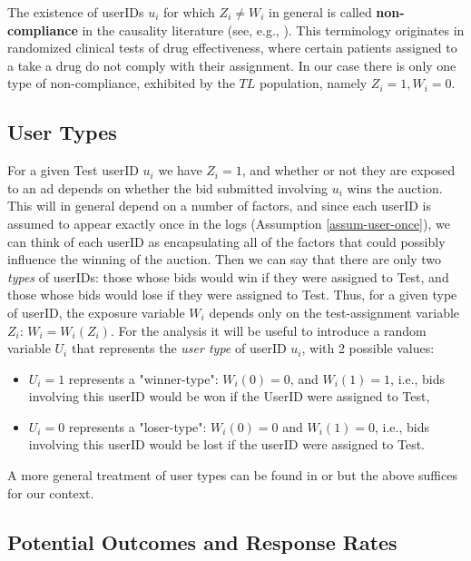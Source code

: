 \documentclass[11pt,a4paper]{article}
\theoremstyle{definition}
\theoremstyle{remark}
\theoremstyle{definition}
\theoremstyle{definition}
\theoremstyle{definition}
\theoremstyle{definition}
\theoremstyle{definition}
\theoremstyle{definition}
\begin{document}
The existence of userIDs $u_i$ for which $Z_i \neq W_i$ in general is called {\bf non-compliance} in the causality literature 
(see, e.g., \cite{Imbens1997a}). This terminology originates in randomized clinical tests of drug effectiveness, where certain patients assigned to a take a drug do not comply with their assignment. In our case there is only one type of non-compliance, exhibited by the $TL$ population, namely $Z_i = 1, W_i=0$. 

\subsection{User Types} \label{sec-user-types}
For a given Test userID $u_i$ we have $Z_i=1$, and whether or not they are exposed to an ad depends on whether the bid submitted involving $u_i$ wins the auction. This will in general depend on a number of factors, and since each userID is assumed to appear exactly once in the logs (Assumption \ref{assum-user-once}), we can think of each userID as encapsulating all of the factors that could possibly influence the winning of the auction. Then we can say that there are only two \textit{types} of userIDs: those whose bids would win if they were assigned to Test, and those whose bids would lose if they were assigned to Test. Thus, for a given type of userID, the exposure variable $W_i$ depends only on the test-assignment variable $Z_i$: $W_i = W_i(Z_i)$. For the analysis it will be useful to introduce a random variable $U_i$ that represents the \textit{user type} of userID $u_i$, with 2 possible values:
\begin{itemize}
	\item $U_i=1$ represents a "winner-type": $W_i(0)=0$, and $W_i(1) = 1$, i.e., bids involving this userID would be won if the UserID were assigned to Test,
	\item $U_i=0$ represents a "loser-type": $W_i(0)=0$ and $W_i(1)=0$, i.e., bids involving this userID would be lost if the userID were assigned to Test.
\end{itemize}
A more general treatment of user types can be found in \cite{Rubin_Causal_2005} or \cite{Chickering1996} but the above suffices for our context.

\subsection{Potential Outcomes and Response Rates} \label{sec-response-rates}
\end{document}
